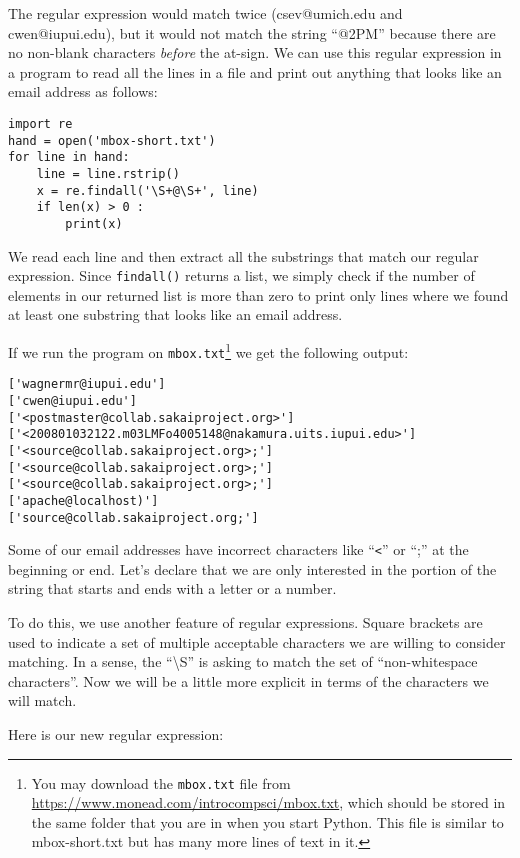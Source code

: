 The regular expression would match twice (csev@umich.edu and cwen@iupui.edu), but it would not
match the string ``@2PM'' because there are no non-blank characters {\em before} the at-sign.  
We can use this regular expression in a program to read all the lines in a file and print out
anything that looks like an email address as follows:

\beforeverb
\begin{verbatim}
import re
hand = open('mbox-short.txt')
for line in hand:
    line = line.rstrip()
    x = re.findall('\S+@\S+', line)
    if len(x) > 0 :
        print(x)
\end{verbatim}
\afterverb
%
We read each line and then extract all the substrings that match our regular expression.
Since {\tt findall()} returns a list, we simply check if the number of elements in our returned
list is more than zero to print only lines where we found at least one substring that looks
like an email address.

If we run the program on {\tt mbox.txt}\footnote{You may download the \texttt{mbox.txt} file from \url{https://www.monead.com/introcompsci/mbox.txt}, which should be stored in the same folder that you are in when you start Python. This file is similar to mbox-short.txt but has many more lines of text in it.} we get the following output:

\beforeverb
\begin{verbatim}
['wagnermr@iupui.edu']
['cwen@iupui.edu']
['<postmaster@collab.sakaiproject.org>']
['<200801032122.m03LMFo4005148@nakamura.uits.iupui.edu>']
['<source@collab.sakaiproject.org>;']
['<source@collab.sakaiproject.org>;']
['<source@collab.sakaiproject.org>;']
['apache@localhost)']
['source@collab.sakaiproject.org;']
\end{verbatim}
\afterverb
%
Some of our email addresses have incorrect characters like ``\verb"<"'' or ``;'' at the beginning
or end.   Let's declare that we are only interested in the portion of the string that starts and
ends with a letter or a number.

To do this, we use another feature of regular expressions.  Square brackets are used to indicate a
set of multiple acceptable characters we are willing to consider matching.  In a sense, the
``{\textbackslash}S'' is asking to match the set of ``non-whitespace characters''.  Now we will be
a little more explicit in terms of the characters we will match.

Here is our new regular expression:

